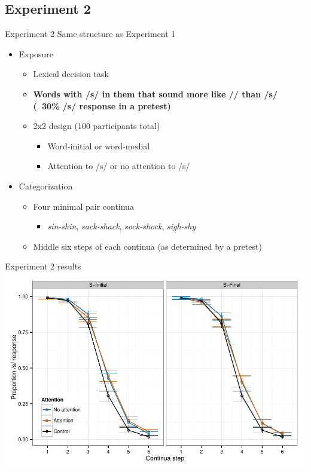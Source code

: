 \documentclass{beamer}
\begin{document}
\subsection{Experiment 2}

\begin{frame}{Experiment 2}
Same structure as Experiment 1
\begin{itemize}
\item Exposure
\begin{itemize}
\item Lexical decision task
\item \textbf{Words with /s/ in them that sound more like /\textesh/ than /s/ (~30\% /s/ response in a pretest) }
\item 2x2 design (100 participants total)
\begin{itemize}
\item Word-initial or word-medial
\item Attention to /s/ or no attention to /s/
\end{itemize}
\end{itemize}
\item Categorization
\begin{itemize}
\item Four minimal pair continua
\begin{itemize}
\item \emph{sin-shin}, \emph{sack-shack}, \emph{sock-shock}, \emph{sigh-shy} 
\end{itemize}
\item Middle six steps of each continua (as determined by a pretest) 
\end{itemize}
\end{itemize}
\end{frame}

\begin{frame}{Experiment 2 results}
\includegraphics[width=\textwidth]{graphs/exp2_categresults_present.pdf}
\end{frame}
\end{document}
